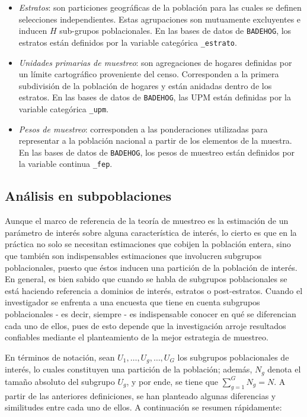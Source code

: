 \documentclass[12pt,spanish,]{book}
\providecommand{\tightlist}{%
  \setlength{\itemsep}{0pt}\setlength{\parskip}{0pt}}
\begin{document}
\begin{itemize}
\tightlist
\item
  \emph{Estratos}: son particiones geográficas de la población para las cuales se definen selecciones independientes. Estas agrupaciones son mutuamente excluyentes e inducen \(H\) sub-grupos poblacionales. En las bases de datos de \texttt{BADEHOG}, los estratos están definidos por la variable categórica \texttt{\_estrato}.
\item
  \emph{Unidades primarias de muestreo}: son agregaciones de hogares definidas por un límite cartográfico proveniente del censo. Corresponden a la primera subdivisión de la población de hogares y están anidadas dentro de los estratos. En las bases de datos de \texttt{BADEHOG}, las UPM están definidas por la variable categórica \texttt{\_upm}.
\item
  \emph{Pesos de muestreo}: corresponden a las ponderaciones utilizadas para representar a la población nacional a partir de los elementos de la muestra. En las bases de datos de \texttt{BADEHOG}, los pesos de muestreo están definidos por la variable continua \texttt{\_fep}.
\end{itemize}

\hypertarget{analisis-en-subpoblaciones}{%
\subsection{Análisis en subpoblaciones}\label{analisis-en-subpoblaciones}}

Aunque el marco de referencia de la teoría de muestreo es la estimación de un parámetro de interés sobre alguna característica de interés, lo cierto es que en la práctica no solo se necesitan estimaciones que cobijen la población entera, sino que también son indispensables estimaciones que involucren subgrupos poblacionales, puesto que éstos inducen una partición de la población de interés. En general, es bien sabido que cuando se habla de subgrupos poblacionales se está haciendo referencia a dominios de interés, estratos o post-estratos. Cuando el investigador se enfrenta a una encuesta que tiene en cuenta subgrupos poblacionales - es decir, siempre - es indispensable conocer en qué se diferencian cada uno de ellos, pues de esto depende que la investigación arroje resultados confiables mediante el planteamiento de la mejor estrategia de muestreo.

En términos de notación, sean \(U_1, \ldots, U_g, \ldots, U_G\) los subgrupos poblacionales de interés, lo cuales constituyen una partición de la población; además, \(N_g\) denota el tamaño absoluto del subgrupo \(U_g\), y por ende, se tiene que \(\sum_{g=1}^G N_g=N\). A partir de las anteriores definiciones, se han planteado algunas diferencias y similitudes entre cada uno de ellos. A continuación se resumen rápidamente:
\end{document}
